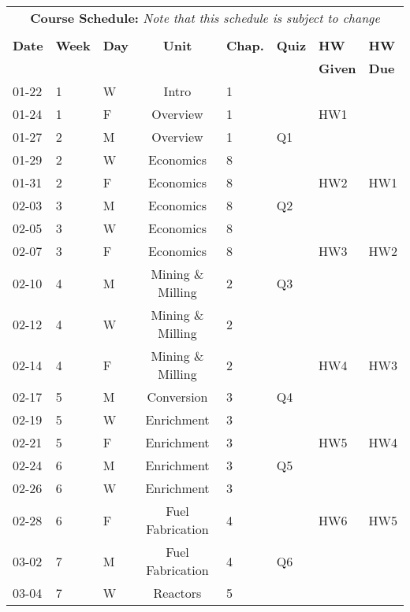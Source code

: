 \documentclass[11pt, a4paper]{article}
\begin{document}
\pagebreak
\FloatBarrier
\renewcommand{\arraystretch}{1}
\begin{table}[h]
\begin{center}
\begin{tabular}{lllcllll}
\multicolumn{8}{c}{\textbf{Course Schedule:}\textit{ Note that this schedule is subject to change}}\\
&&&&&&&\\
\textbf{Date} & \textbf{Week} & \textbf{Day} & \textbf{Unit} & \textbf{Chap.} & \textbf{Quiz} & \textbf{HW} & \textbf{HW}\\
 &  &  &  &  &                                                                                          & \textbf{Given} & \textbf{Due}\\
\hline
\hline
01-22 & 1 & W & Intro      & 1 &           &      &    \\
01-24 & 1 & F & Overview   & 1 &           &  HW1 &    \\
01-27 & 2 & M & Overview   & 1 &        Q1 &      &    \\
01-29 & 2 & W & Economics  & 8 &           &      &    \\
01-31 & 2 & F & Economics  & 8 &           &  HW2 & HW1\\
02-03 & 3 & M & Economics  & 8 &        Q2 &      &    \\
02-05 & 3 & W & Economics  & 8 &           &      &    \\
02-07 & 3 & F & Economics  & 8 &           &  HW3 & HW2\\
02-10 & 4 & M & Mining \& Milling & 2 & Q3 &      &    \\
02-12 & 4 & W & Mining \& Milling & 2 &    &      &    \\
02-14 & 4 & F & Mining \& Milling & 2 &    &  HW4 & HW3\\
02-17 & 5 & M & Conversion & 3 &        Q4 &      &    \\
02-19 & 5 & W & Enrichment & 3 &           &      &    \\
02-21 & 5 & F & Enrichment & 3 &           &  HW5 & HW4\\
02-24 & 6 & M & Enrichment & 3 &        Q5 &      &    \\
02-26 & 6 & W & Enrichment & 3 &           &      &    \\
02-28 & 6 & F & Fuel Fabrication & 4 &     &  HW6 & HW5\\
03-02 & 7 & M & Fuel Fabrication & 4 &  Q6 &      &    \\
03-04 & 7 & W & Reactors & 5 &             &      &    \\

\end{tabular}
\end{center}
\end{table}
\end{document}
